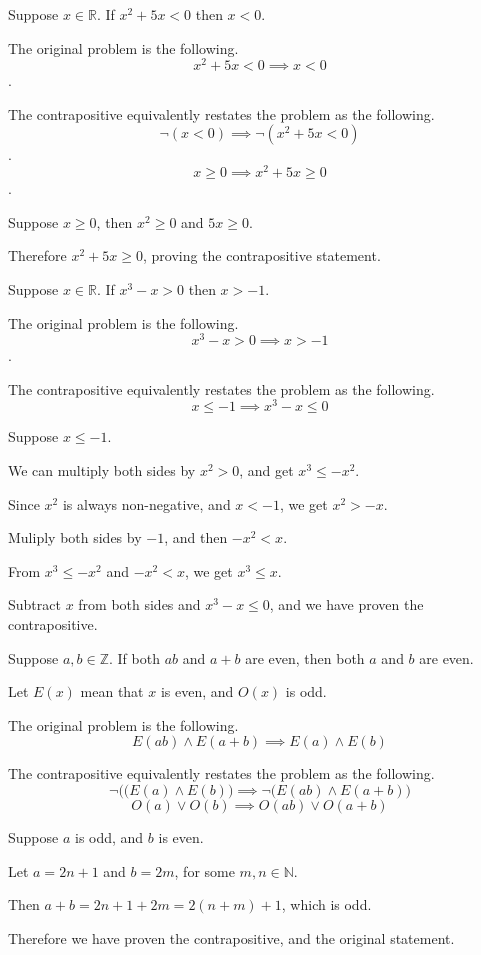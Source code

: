 \documentclass[openany, 12pt]{book}
\begin{document}
\begin{exercise}{}{}
	Suppose $x \in \mathbb{R}$. If $x^2 + 5x < 0$ then $x<0$.
	\begin{alist}
		\item The original problem is the following.
		$$x^2 + 5x < 0 \implies x<0$$.
		\item The contrapositive equivalently restates the problem as the following.
		$$\neg(x < 0) \implies \neg(x^2 + 5x < 0)$$.
		$$x \geq 0 \implies x^2 + 5x \geq 0$$.
		\item Suppose $x \geq 0$, then $x^2 \geq 0$ and $5x \geq 0$.
		\item Therefore $x^2 + 5x \geq 0$, proving the contrapositive statement.
	\end{alist}
\end{exercise}

\begin{exercise}{}{}
	Suppose $x \in \mathbb{R}$. If $x^3 -x > 0$ then $x>-1$.
	\begin{alist}
		\item The original problem is the following. $$x^3 -x > 0 \implies x>-1$$.
		\item The contrapositive equivalently restates the problem as the following.
		$$x \leq -1 \implies x^3 -x \leq 0$$
		\item Suppose $x \leq -1 $.
		\item We can multiply both sides by $x^2 > 0$, and get $x^3 \leq -x^2.$
		\item Since $x^2$ is always non-negative, and $x<-1$, we get $x^2 > -x$.
		\item Muliply both sides by $-1$, and then $-x^2 < x$.
		\item From $x^3 \leq -x^2$ and $-x^2 < x$, we get $x^3 \leq x$.
		\item Subtract $x$ from both sides and $x^3 -x \leq 0$, and we have proven the
		contrapositive.
	\end{alist}
\end{exercise}

\begin{exercise}{}{}
	Suppose $a, b \in \mathbb{Z}$. If both $ab$ and $a + b$
	are even, then both $a$ and $b$ are even.
	\begin{alist}
		\item Let $E(x)$ mean that $x$ is even, and $O(x)$ is odd.
		\item The original problem is the following.
		$$E(ab) \land E(a+b) \implies E(a) \land E(b) $$
		\item The contrapositive equivalently restates the problem as the following.
		$$\neg\big( (E(a) \land E(b)\big) \implies \neg \big(E(ab) \land E(a+b)\big) $$
		$$ O(a) \lor O(b) \implies O(ab) \lor O(a+b) $$
		\item Suppose $a$ is odd, and $b$ is even.
		\item Let $a=2n+1$ and $b=2m$, for some $m, n \in \mathbb{N}$.
		\item Then $a + b = 2n+1 + 2m = 2(n + m) +1$, which is odd.
		\item Therefore we have proven the contrapositive, and the original statement.
	\end{alist}
\end{exercise}
\end{document}
